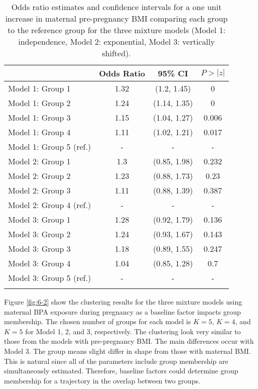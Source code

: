 \begin{table}[ht]
\begin{center}
\begin{tabular}{lccc}
  \thickhline
 & Odds Ratio & 95\% CI& $P>|z|$ \\ 
  \hline
Model 1: Group  1 & 1.32 & (1.2, 1.45) & 0 \\ 
  Model 1: Group  2 & 1.24 & (1.14, 1.35) & 0 \\ 
  Model 1: Group  3 & 1.15 & (1.04, 1.27) & 0.006 \\ 
  Model 1: Group  4 & 1.11 & (1.02, 1.21) & 0.017 \\ 
  Model 1: Group  5  (ref.) & - & - & - \\ 
  Model 2: Group  1 & 1.3 & (0.85, 1.98) & 0.232 \\ 
  Model 2: Group  2 & 1.23 & (0.88, 1.73) & 0.23 \\ 
  Model 2: Group  3 & 1.11 & (0.88, 1.39) & 0.387 \\ 
  Model 2: Group  4  (ref.) & - & - & - \\ 
  Model 3: Group  1 & 1.28 & (0.92, 1.79) & 0.136 \\ 
  Model 3: Group  2 & 1.24 & (0.93, 1.67) & 0.143 \\ 
  Model 3: Group  3 & 1.18 & (0.89, 1.55) & 0.247 \\ 
  Model 3: Group  4 & 1.04 & (0.85, 1.28) & 0.7 \\ 
  Model 3: Group  5  (ref.) & - & - & - \\ 
   \thickhline
\end{tabular}
\caption{Odds ratio estimates and confidence intervals for a one unit increase in maternal pre-pregnancy BMI comparing each group to the reference group for the three mixture models (Model 1: independence, Model 2: exponential, Model 3: vertically shifted). }
\end{center}
\label{tab:6-1}
\end{table}

Figure \ref{fig:6-2} show the clustering results for the three mixture models using maternal BPA exposure during pregnancy as a baseline factor impacts group membership. The chosen number of groups for each model is $K = 5$, $K=4$, and $K=5$ for Model 1, 2, and 3, respectively. The clustering look very similar to those from the models with pre-pregnancy BMI. The main differences occur with Model 3. The group means slight differ in shape from those with maternal BMI. This is natural since all of the parameters include group membership are simultaneously estimated. Therefore, baseline factors could determine group membership for a trajectory in the overlap between two groups.

